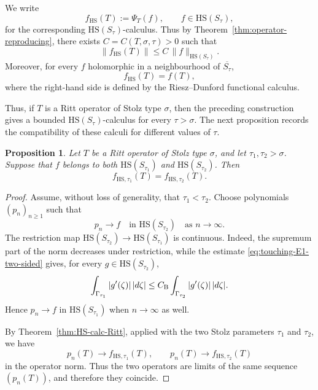 \documentclass[11pt]{amsart}
\numberwithin{equation}{section}
\newtheorem{proposition}[theorem]{Proposition}
\theoremstyle{definition}
\theoremstyle{plain}
\newcommand{\HS}{\mathrm{HS}}
\begin{document}
We write
\[
        f_{\HS}(T):=\Psi_T(f),\qquad f\in\HS(S_\tau),
\]
for the corresponding \(\HS(S_\tau)\)-calculus.  
Thus by Theorem~\ref{thm:operator-reproducing}, 
there exists
\(C=C(T,\sigma,\tau)>0\) such that
\begin{equation}\label{eq:HS-calc-bound}
        \|f_{\HS}(T)\|
        \le
        C\,\|f\|_{\HS(S_\tau)}.
\end{equation}
Moreover, for every \(f\) holomorphic in a neighbourhood of \(\overline{S_\tau}\),
\[
        f_{\HS}(T)=f(T),
\]
where the right-hand side is defined by the Riesz--Dunford functional calculus.

Thus, if \(T\) is a Ritt operator of Stolz type \(\sigma\), then the preceding construction gives a bounded \(\HS(S_\tau)\)-calculus for every \(\tau>\sigma\).  The next proposition records the compatibility of these calculi for different values of \(\tau\).

\begin{proposition}\label{prop:HS-outer-independence}
Let $T$ be a Ritt operator of Stolz type $\sigma$, and let
$\tau_1,\tau_2>\sigma$.  Suppose that $f$ belongs to both
$\HS(S_{\tau_1})$ and $\HS(S_{\tau_2})$.  Then 
\[
   f_{\HS,\tau_1}(T)=f_{\HS,\tau_2}(T).
\]
\end{proposition}

\begin{proof}
Assume, without loss of generality, that $\tau_1<\tau_2$.  Choose
polynomials $(p_n)_{n \ge 1}$ such that
\[
   p_n\to f \quad\text{in }\HS(S_{\tau_2}) \quad\text{as } n\to\infty.
\]
The restriction map
$\HS(S_{\tau_2})\to\HS(S_{\tau_1})$ is continuous.  Indeed, the
supremum part of the norm decreases under restriction, while
the estimate \eqref{eq:touching-E1-two-sided}
 gives, for every
$g\in\HS(S_{\tau_2})$,
\[
   \int_{\Gamma_{\tau_1}} |g'(\zeta)|\,|d\zeta|
   \le  C_{\rm B} 
   \int_{\Gamma_{\tau_2}} |g'(\zeta)|\,|d\zeta|.
\]
Hence $p_n\to f$ in $\HS(S_{\tau_1})$  when $n \to \infty$ as well.

By Theorem~\ref{thm:HS-calc-Ritt}, applied with the two Stolz parameters
$\tau_1$ and $\tau_2$, we have
\[
   p_n(T)\to f_{\HS,\tau_1}(T),
   \qquad
   p_n(T)\to f_{\HS,\tau_2}(T)
\]
in the operator norm.  Thus the two operators are limits of the same sequence
\((p_n(T))\), and therefore they coincide.
\end{proof}
\end{document}
